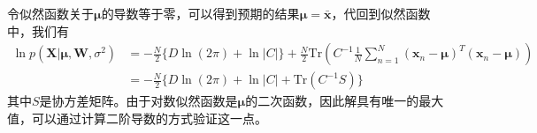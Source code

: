 令似然函数关于$\boldsymbol{\mu}$的导数等于零，可以得到预期的结果$\boldsymbol{\mu}=\bar{\boldsymbol{x}}$，代回到似然函数中，我们有
\begin{equation}
\begin{aligned}
	\ln p(\boldsymbol{X}|\boldsymbol{\mu},\boldsymbol{W},\sigma^2)&=-\frac{N}{2}\{D\ln (2\pi)+\ln |C|\}+\frac{N}{2}\mathrm{Tr}\left(C^{-1}\frac{1}{N}\sum_{n=1}^{N}(\boldsymbol{x}_n-\boldsymbol{\mu})^T(\boldsymbol{x}_n-\boldsymbol{\mu}) \right)\\
	&=-\frac{N}{2}\{D\ln (2\pi)+\ln |C|+\mathrm{Tr}(C^{-1}S) \}
\end{aligned}
\end{equation}
其中$S$是协方差矩阵。由于对数似然函数是$\boldsymbol{\mu}$的二次函数，因此解具有唯一的最大值，可以通过计算二阶导数的方式验证这一点。


